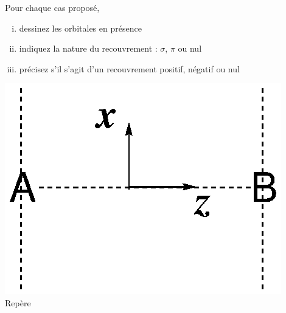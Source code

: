 Pour chaque cas propos\'e,

\begin{minipage}[c]{0.8\linewidth}
\begin{enumerate}[(i)] 
\item dessinez les orbitales en pr\'esence
\item indiquez la nature du recouvrement : $\sigma$, $\pi$ ou nul 
\item  pr\'ecisez s'il s'agit d'un recouvrement positif, n\'egatif ou nul
\end{enumerate} 
\end{minipage}
\begin{minipage}[l]{0.1\linewidth}     
\includegraphics[scale=0.4]{figure/AB_repere.eps}\\   
Rep\`ere
\end{minipage}

\vspace{0.3cm}

